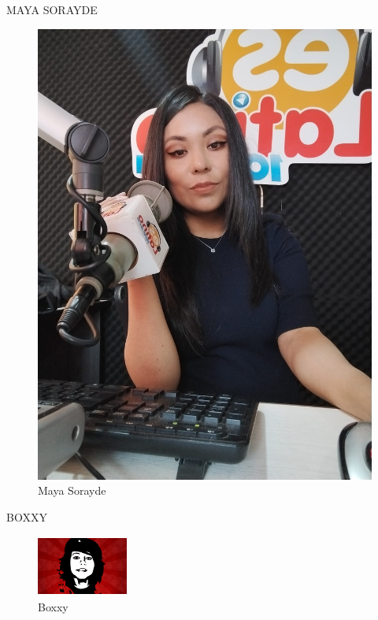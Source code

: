 \documentclass{article}
\begin{document}
MAYA SORAYDE
\begin{figure}[h]		%
\centering
\includegraphics[width=0.50\linewidth]{MayaSorayde.jpg}
\caption{Maya Sorayde}			%
\label{fig:Maya}				%
\end{figure}
BOXXY
\begin{figure}[h]		%
\centering
\includegraphics[width=3cm,height=2cm]{boxxy.png}
\caption{Boxxy}			%
\label{fig:Boxxy}				%
\end{figure}
\end{document}
